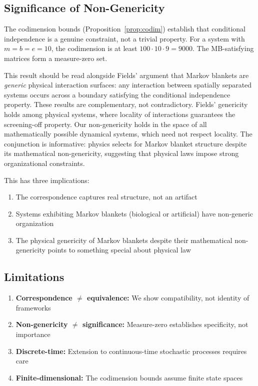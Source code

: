 \documentclass[11pt,a4paper]{article}
\begin{document}
\subsection{Significance of Non-Genericity}

The codimension bounds (Proposition~\ref{prop:codim}) establish that conditional independence is a genuine constraint, not a trivial property. For a system with $m = b = e = 10$, the codimension is at least $100 \cdot 10 \cdot 9 = 9000$. The MB-satisfying matrices form a measure-zero set.

This result should be read alongside Fields' \cite{fields2019} argument that Markov blankets are \emph{generic} physical interaction surfaces: any interaction between spatially separated systems occurs across a boundary satisfying the conditional independence property. These results are complementary, not contradictory. Fields' genericity holds among physical systems, where locality of interactions guarantees the screening-off property. Our non-genericity holds in the space of all mathematically possible dynamical systems, which need not respect locality. The conjunction is informative: physics selects for Markov blanket structure despite its mathematical non-genericity, suggesting that physical laws impose strong organizational constraints.

This has three implications:
\begin{enumerate}[nosep]
    \item The correspondence captures real structure, not an artifact
    \item Systems exhibiting Markov blankets (biological or artificial) have non-generic organization
    \item The physical genericity of Markov blankets \cite{fields2019} despite their mathematical non-genericity points to something special about physical law
\end{enumerate}

\subsection{Limitations}

\begin{enumerate}[nosep]
    \item \textbf{Correspondence $\neq$ equivalence:} We show compatibility, not identity of frameworks
    \item \textbf{Non-genericity $\neq$ significance:} Measure-zero establishes specificity, not importance
    \item \textbf{Discrete-time:} Extension to continuous-time stochastic processes requires care
    \item \textbf{Finite-dimensional:} The codimension bounds assume finite state spaces
\end{enumerate}
\end{document}
